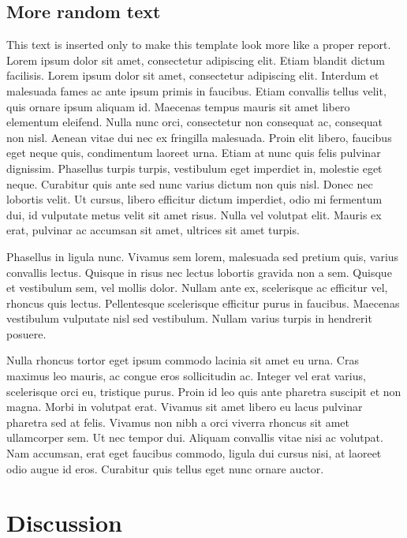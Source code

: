 \documentclass[fleqn,moreauthors,10pt]{ds_report}
\begin{document}
\subsection*{More random text}

This text is inserted only to make this template look more like a proper report. Lorem ipsum dolor sit amet, consectetur adipiscing elit. Etiam blandit dictum facilisis. Lorem ipsum dolor sit amet, consectetur adipiscing elit. Interdum et malesuada fames ac ante ipsum primis in faucibus. Etiam convallis tellus velit, quis ornare ipsum aliquam id. Maecenas tempus mauris sit amet libero elementum eleifend. Nulla nunc orci, consectetur non consequat ac, consequat non nisl. Aenean vitae dui nec ex fringilla malesuada. Proin elit libero, faucibus eget neque quis, condimentum laoreet urna. Etiam at nunc quis felis pulvinar dignissim. Phasellus turpis turpis, vestibulum eget imperdiet in, molestie eget neque. Curabitur quis ante sed nunc varius dictum non quis nisl. Donec nec lobortis velit. Ut cursus, libero efficitur dictum imperdiet, odio mi fermentum dui, id vulputate metus velit sit amet risus. Nulla vel volutpat elit. Mauris ex erat, pulvinar ac accumsan sit amet, ultrices sit amet turpis.

Phasellus in ligula nunc. Vivamus sem lorem, malesuada sed pretium quis, varius convallis lectus. Quisque in risus nec lectus lobortis gravida non a sem. Quisque et vestibulum sem, vel mollis dolor. Nullam ante ex, scelerisque ac efficitur vel, rhoncus quis lectus. Pellentesque scelerisque efficitur purus in faucibus. Maecenas vestibulum vulputate nisl sed vestibulum. Nullam varius turpis in hendrerit posuere.

Nulla rhoncus tortor eget ipsum commodo lacinia sit amet eu urna. Cras maximus leo mauris, ac congue eros sollicitudin ac. Integer vel erat varius, scelerisque orci eu, tristique purus. Proin id leo quis ante pharetra suscipit et non magna. Morbi in volutpat erat. Vivamus sit amet libero eu lacus pulvinar pharetra sed at felis. Vivamus non nibh a orci viverra rhoncus sit amet ullamcorper sem. Ut nec tempor dui. Aliquam convallis vitae nisi ac volutpat. Nam accumsan, erat eget faucibus commodo, ligula dui cursus nisi, at laoreet odio augue id eros. Curabitur quis tellus eget nunc ornare auctor.



\section*{Discussion}
\end{document}
